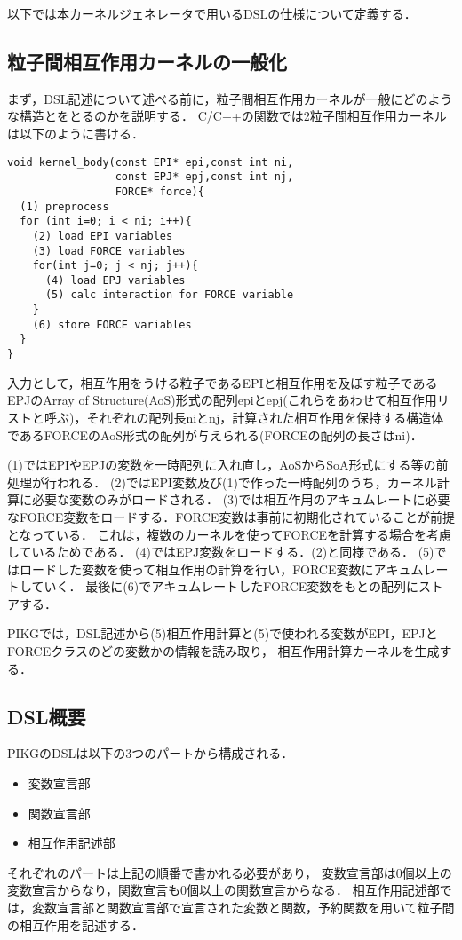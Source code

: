 \documentclass{article}
\begin{document}
以下では本カーネルジェネレータで用いるDSLの仕様について定義する．

\subsection{粒子間相互作用カーネルの一般化}
まず，DSL記述について述べる前に，粒子間相互作用カーネルが一般にどのような構造とをとるのかを説明する．
C/C++の関数では2粒子間相互作用カーネルは以下のように書ける．
\begin{verbatim}
void kernel_body(const EPI* epi,const int ni,
                 const EPJ* epj,const int nj,
                 FORCE* force){
  (1) preprocess
  for (int i=0; i < ni; i++){
    (2) load EPI variables
    (3) load FORCE variables
    for(int j=0; j < nj; j++){
      (4) load EPJ variables
      (5) calc interaction for FORCE variable
    }
    (6) store FORCE variables
  }
}
\end{verbatim}
入力として，相互作用をうける粒子であるEPIと相互作用を及ぼす粒子であるEPJのArray of Structure(AoS)形式の配列epiとepj(これらをあわせて相互作用リストと呼ぶ)，それぞれの配列長niとnj，計算された相互作用を保持する構造体であるFORCEのAoS形式の配列が与えられる(FORCEの配列の長さはni)．

(1)ではEPIやEPJの変数を一時配列に入れ直し，AoSからSoA形式にする等の前処理が行われる．
(2)ではEPI変数及び(1)で作った一時配列のうち，カーネル計算に必要な変数のみがロードされる．
(3)では相互作用のアキュムレートに必要なFORCE変数をロードする．FORCE変数は事前に初期化されていることが前提となっている．
これは，複数のカーネルを使ってFORCEを計算する場合を考慮しているためである．
(4)ではEPJ変数をロードする．(2)と同様である．
(5)ではロードした変数を使って相互作用の計算を行い，FORCE変数にアキュムレートしていく．
最後に(6)でアキュムレートしたFORCE変数をもとの配列にストアする．

PIKGでは，DSL記述から(5)相互作用計算と(5)で使われる変数がEPI，EPJとFORCEクラスのどの変数かの情報を読み取り，
相互作用計算カーネルを生成する．

\subsection{DSL概要}
PIKGのDSLは以下の3つのパートから構成される．
 \begin{itemize}
  \item 変数宣言部
  \item 関数宣言部
  \item 相互作用記述部
 \end{itemize}
 それぞれのパートは上記の順番で書かれる必要があり，
 変数宣言部は0個以上の変数宣言からなり，関数宣言も0個以上の関数宣言からなる．
 相互作用記述部では，変数宣言部と関数宣言部で宣言された変数と関数，予約関数を用いて粒子間の相互作用を記述する．
\end{document}
